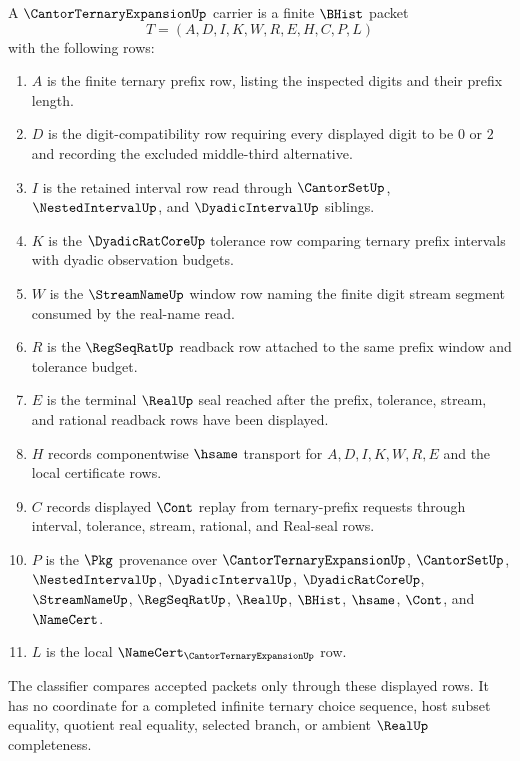 \begin{definition}
\label{def:cantor-ternary-expansion-carrier}
A $\CantorTernaryExpansionUp$ carrier is a finite $\BHist$ packet
$$
T=(A,D,I,K,W,R,E,H,C,P,L)
$$
with the following rows:
\begin{enumerate}
\item $A$ is the finite ternary prefix row, listing the inspected digits and their prefix length.
\item $D$ is the digit-compatibility row requiring every displayed digit to be $0$ or $2$ and recording the excluded middle-third alternative.
\item $I$ is the retained interval row read through $\CantorSetUp$, $\NestedIntervalUp$, and $\DyadicIntervalUp$ siblings.
\item $K$ is the $\DyadicRatCoreUp$ tolerance row comparing ternary prefix intervals with dyadic observation budgets.
\item $W$ is the $\StreamNameUp$ window row naming the finite digit stream segment consumed by the real-name read.
\item $R$ is the $\RegSeqRatUp$ readback row attached to the same prefix window and tolerance budget.
\item $E$ is the terminal $\RealUp$ seal reached after the prefix, tolerance, stream, and rational readback rows have been displayed.
\item $H$ records componentwise $\hsame$ transport for $A,D,I,K,W,R,E$ and the local certificate rows.
\item $C$ records displayed $\Cont$ replay from ternary-prefix requests through interval, tolerance, stream, rational, and Real-seal rows.
\item $P$ is the $\Pkg$ provenance over $\CantorTernaryExpansionUp$, $\CantorSetUp$, $\NestedIntervalUp$, $\DyadicIntervalUp$, $\DyadicRatCoreUp$, $\StreamNameUp$, $\RegSeqRatUp$, $\RealUp$, $\BHist$, $\hsame$, $\Cont$, and $\NameCert$.
\item $L$ is the local $\NameCert_{\CantorTernaryExpansionUp}$ row.
\end{enumerate}
The classifier compares accepted packets only through these displayed rows. It has no coordinate for a completed infinite ternary choice sequence, host subset equality, quotient real equality, selected branch, or ambient $\RealUp$ completeness.
\end{definition}

